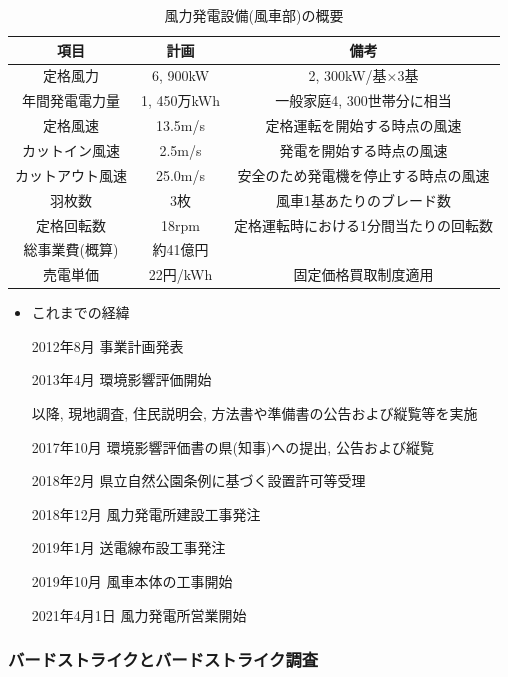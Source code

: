 \documentclass[dvipdfmx]{jsarticle}
\begin{document}
\begin{table}[H]
    \centering
    \begin{tabular}{|c|c|c|}
    \hline
    \textbf{項目} & \textbf{計画} & \multicolumn{1}{c|}{\textbf{備考}} \\
    \hline
    定格風力 & 6, 900kW & 2, 300kW/基×3基 \\
    \hline
    年間発電電力量 & 1, 450万kWh & 一般家庭4, 300世帯分に相当 \\
    \hline
    定格風速 & 13.5m/s & 定格運転を開始する時点の風速 \\
    \hline
    カットイン風速 & 2.5m/s & 発電を開始する時点の風速 \\
    \hline
    カットアウト風速 & 25.0m/s & 安全のため発電機を停止する時点の風速 \\
    \hline
    羽枚数 & 3枚 & 風車1基あたりのブレード数 \\
    \hline
    定格回転数 & 18rpm & 定格運転時における1分間当たりの回転数 \\
    \hline
    総事業費(概算) & 約41億円 & \\
    \hline
    売電単価 & 22円/kWh & 固定価格買取制度適用 \\
    \hline
    \end{tabular}
    \caption{風力発電設備(風車部)の概要}
\end{table}

\begin{itemize}
    \item これまでの経緯

    2012年8月 事業計画発表
    
    2013年4月 環境影響評価開始
    
        以降, 現地調査, 住民説明会, 方法書や準備書の公告および縦覧等を実施
        
    2017年10月 環境影響評価書の県(知事)への提出, 公告および縦覧
    
    2018年2月 県立自然公園条例に基づく設置許可等受理
    
    2018年12月 風力発電所建設工事発注
    
    2019年1月 送電線布設工事発注
    
    2019年10月 風車本体の工事開始
    
    2021年4月1日 風力発電所営業開始
    
\end{itemize}

\subsubsection{バードストライクとバードストライク調査}
\end{document}
